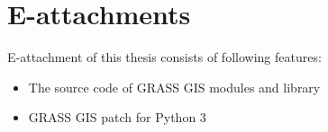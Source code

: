 \chapter{E-attachments}
\label{attach}

E-attachment of this thesis consists of following features:

\begin{itemize}
	\item The source code of GRASS GIS modules and library
	\item GRASS GIS patch for Python 3
\end{itemize}
